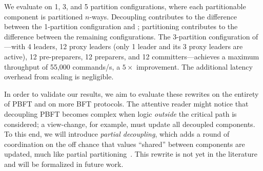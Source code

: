We evaluate \ScalablePBFT{} on 1, 3, and 5 partition configurations, where each partitionable component is partitioned $n$-ways.
Decoupling contributes to the difference between the 1-partition configuration and \BasePBFT{}; partitioning contributes to the difference between the remaining configurations.
The 3-partition configuration of \ScalablePBFT{}---with 4 leaders, 12 proxy leaders (only 1 leader and its 3 proxy leaders are active), 12 pre-preparers, 12 preparers, and 12 committers---achieves a maximum throughput of 55,000 commands/s, a $5\times$ improvement.
The additional latency overhead from scaling is negligible.

In order to validate our results, we aim to evaluate these rewrites on the entirety of PBFT and on more BFT protocols.
The attentive reader might notice that decoupling PBFT becomes complex when logic \emph{outside} the critical path is considered; a view-change, for example, must update all decoupled components.
To this end, we will introduce \emph{partial decoupling}, which adds a round of coordination on the off chance that values ``shared'' between components are updated, much like partial partitioning~\cite{autocomp}.
This rewrite is not yet in the literature and will be formalized in future work.
